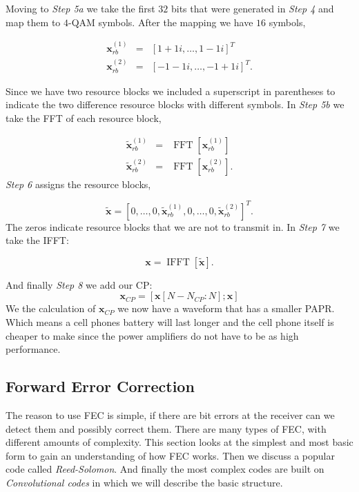 Moving to \emph{Step 5a} we take the first $32$ bits that were generated in \emph{Step 4} and map them to $4$-\ac{QAM} symbols. After the mapping we have $16$ symbols,

\begin{eqnarray}
\mathbf{x}_{rb}^{(1)}&=&[1+1i,\dots,1-1i]^T\\
\mathbf{x}_{rb}^{(2)}&=&[-1-1i,\dots,-1+1i]^T.
\end{eqnarray}
\noindent

Since we have two resource blocks we included a superscript in parentheses to indicate the two difference resource blocks with different symbols. In \emph{Step 5b} we take the \ac{FFT} of each resource block,

\begin{eqnarray}
\tilde{\mathbf{x}}_{rb}^{(1)}&=&\operatorname{FFT}\left[\mathbf{x}_{rb}^{(1)}\right]\\
\tilde{\mathbf{x}}_{rb}^{(2)}&=&\operatorname{FFT}\left[\mathbf{x}_{rb}^{(2)}\right].
\end{eqnarray} 
\noindent
\emph{Step 6} assigns the resource blocks,

\begin{equation}
\tilde{\mathbf{x}}=[0,\dots,0,\tilde{\mathbf{x}}_{rb}^{(1)},0,\dots,0,\tilde{\mathbf{x}}_{rb}^{(2)}]^T.
\end{equation}
\noindent 
The zeros indicate resource blocks that we are not to transmit in. In \emph{Step 7} we take the \ac{IFFT}:

\begin{equation}
\mathbf{x}=\operatorname{IFFT}\left[\tilde{\mathbf{x}}\right].
\end{equation}
\noindent

And finally \emph{Step 8} we add our \ac{CP}:
\begin{equation}
\mathbf{x}_{CP}=[\mathbf{x}[N-N_{CP}:N]; \mathbf{x}]
\end{equation}
\noindent 
We the calculation of $\mathbf{x}_{CP}$ we now have a waveform that has a smaller \ac{PAPR}. Which means a cell phones battery will last longer and the cell phone itself is cheaper to make since the power amplifiers do not have to be as high performance. 
	
\subsection{Forward Error Correction}

The reason to use \ac{FEC} is simple, if there are bit errors at the receiver can we detect them and possibly correct them. There are many types of \ac{FEC}, with different amounts of complexity. This section looks at the simplest and most basic form to gain an understanding of how \ac{FEC} works. Then we discuss a popular code called \emph{Reed-Solomon}. And finally the most complex codes are built on \emph{Convolutional codes} in which we will describe the basic structure. 
	
